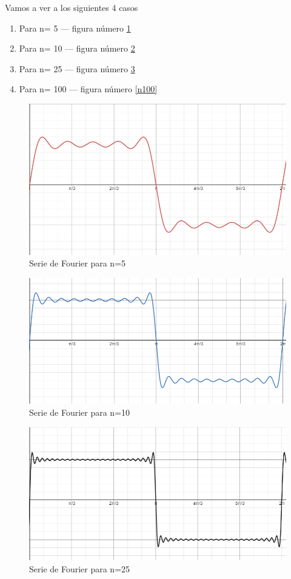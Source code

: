 \documentclass[../main.tex]{subfiles}
\begin{document}
	Vamos a ver a los siguientes 4 casos
	\begin{enumerate}
		\item Para n= 5 --- figura número \ref{n5}
		\item Para n= 10 --- figura número \ref{n10}
		\item Para n= 25 --- figura número \ref{n25}
		\item Para n= 100 --- figura número \ref{n100}
	\end{enumerate}
	\begin{figure}[H]
		\centering
		\includegraphics[width=\textwidth]{fourier/volpa/image5.png}
		\caption{Serie de Fourier para n=5}
		\label{n5}
	\end{figure}
	\begin{figure}[H]
		\centering
		\includegraphics[width=\textwidth]{fourier/volpa/image6.png}
		\caption{Serie de Fourier para n=10}
		\label{n10}
	\end{figure}
	\begin{figure}[H]
		\centering
		\includegraphics[width=\textwidth]{fourier/volpa/image7.png}
		\caption{Serie de Fourier para n=25}
		\label{n25}
	\end{figure}
\end{document}
